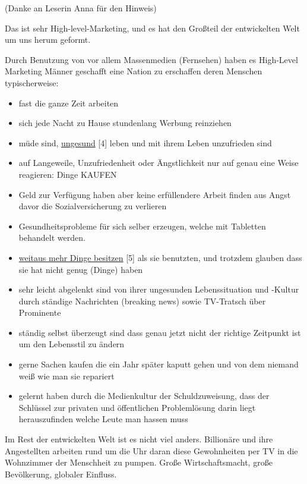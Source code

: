 (Danke an Leserin Anna für den Hinweis)

Das ist sehr High-level-Marketing, und es hat den Großteil der entwickelten Welt um uns herum geformt.

Durch Benutzung von vor allem Massenmedien (Fernsehen) haben es High-Level Marketing Männer geschafft eine Nation zu erschaffen deren Menschen typischerweise:

\begin{itemize}
\item fast die ganze Zeit arbeiten
\item sich jede Nacht zu Hause stundenlang Werbung reinziehen
\item müde sind, \href{http://www.raptitude.com/2010/10/being-healthy-is-not-normal/}{ungesund} [4] leben und mit ihrem Leben unzufrieden sind
\item auf Langeweile, Unzufriedenheit oder Ängstlichkeit nur auf genau eine Weise reagieren: Dinge KAUFEN
\item Geld zur Verfügung haben aber keine erfüllendere Arbeit finden aus Angst davor die Sozialversicherung zu verlieren
\item Gesundheitsprobleme für sich selber erzeugen, welche mit Tabletten behandelt werden.
\item \href{http://www.raptitude.com/2011/01/i-dont-want-stuff-any-more-only-things/}{weitaus mehr Dinge besitzen} [5] als sie benutzten, und trotzdem glauben dass sie hat nicht genug (Dinge) haben
\item sehr leicht abgelenkt sind von ihrer ungesunden Lebenssituation und -Kultur durch ständige Nachrichten (breaking news) sowie TV-Tratsch über Prominente
\item ständig selbst überzeugt sind dass genau jetzt nicht der richtige Zeitpunkt ist um den Lebensstil zu ändern
\item gerne Sachen kaufen die ein Jahr später kaputt gehen und von dem niemand weiß wie man sie repariert
\item gelernt haben durch die Medienkultur der Schuldzuweisung, dass der Schlüssel zur privaten und öffentlichen Problemlösung darin liegt herauszufinden welche Leute man hassen muss
\end{itemize}

Im Rest der entwickelten Welt ist es nicht viel anders. Billionäre und ihre Angestellten arbeiten rund um die Uhr daran diese Gewohnheiten per TV in die Wohnzimmer der Menschheit zu pumpen. Große Wirtschaftsmacht, große Bevölkerung, globaler Einfluss.

